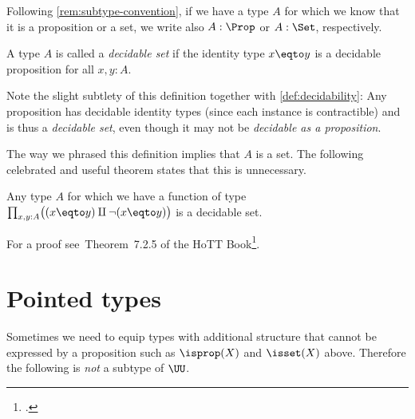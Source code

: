 Following \cref{rem:subtype-convention},
if we have a type $A$ for which we know that it is a proposition or a set,
we write also $A : \Prop$ or $A : \Set$, respectively.

\begin{definition}\label{def:decidable-set}
  A type $A$ is called a \emph{decidable set} if the identity type $x \eqto y$
  is a decidable proposition for all $x,y:A$.
\end{definition}
Note the slight subtlety of this definition together with
\cref{def:decidability}: Any proposition has decidable identity types
(since each instance is contractible) and is thus a \emph{decidable set},
even though it may not be \emph{decidable as a proposition}.

The way we phrased this definition implies that $A$ is a set.
The following celebrated and useful theorem states that this is unnecessary.
\begin{theorem}[Hedberg]\label{thm:hedberg}
  Any type $A$ for which we have a function of type
  $\prod_{x,y:A}\bigl((x \eqto y) \amalg \lnot(x \eqto y)\bigr)$
  is a decidable set.
\end{theorem}
For a proof see~Theorem~7.2.5 of the HoTT Book\footcite{hottbook}.

\section{Pointed types}\label{sec:pointedtypes}
Sometimes we need to equip types with additional structure
that cannot be expressed by a proposition such as
$\isprop(X)$ and $\isset(X)$ above.
Therefore the following is \emph{not} a subtype of $\UU$.

